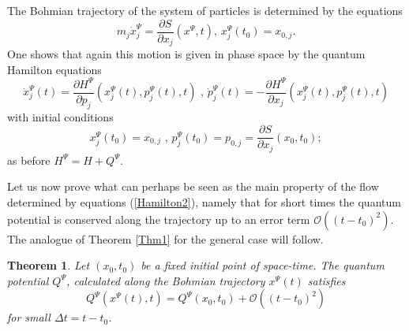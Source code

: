 \documentclass[12pt]{article}%
\newtheorem{theorem}{Theorem}
\begin{document}
The Bohmian trajectory of the system of particles is determined by the
equations
\begin{equation}
m_{j}\dot{x}_{j}^{\Psi}=\frac{\partial S}{\partial x_{j}}(x^{\Psi},t)\text{
\ , \ }x_{j}^{\Psi}(t_{0})=x_{0,j}. \label{Bohm2}%
\end{equation}
One shows that again this motion is given in phase space by the quantum
Hamilton equations%
\begin{equation}
\dot{x}_{j}^{\Psi}(t)=\frac{\partial H^{\Psi}}{\partial p_{j}}(x_{j}^{\Psi
}(t),p_{j}^{\Psi}(t),t)\text{ \ , \ }\dot{p}_{j}^{\Psi}(t)=-\frac{\partial
H^{\Psi}}{\partial x_{j}}(x_{j}^{\Psi}(t),p_{j}^{\Psi}(t),t) \label{Hamilton2}%
\end{equation}
with initial conditions
\[
x_{j}^{\Psi}(t_{0})=x_{0,j}\text{ \ , \ }p_{j}^{\Psi}(t_{0})=p_{0,j}%
=\frac{\partial S}{\partial x_{j}}(x_{0},t_{0});
\]
as before $H^{\Psi}=H+Q^{\Psi}$.

Let us now prove what can perhaps be seen as the main property of the flow
determined by equations (\ref{Hamilton2}), namely that for short times the
quantum potential is conserved along the trajectory up to an error term
$\mathcal{O}((t-t_{0})^{2})$. The analogue of Theorem \ref{Thm1} for the
general case will follow.

\begin{theorem}
\label{Thm2}Let $(x_{0},t_{0})$ be a fixed initial point of space-time. The
quantum potential $Q^{\Psi}$, calculated along the Bohmian trajectory
$x^{\Psi}(t)$ satisfies%
\begin{equation}
Q^{\Psi}(x^{\Psi}(t),t)=Q^{\Psi}(x_{0},t_{0})+\mathcal{O}((t-t_{0})^{2})
\label{smallq}%
\end{equation}
for small $\Delta t=t-t_{0}$.
\end{theorem}
\end{document}
